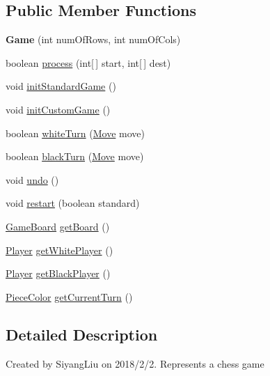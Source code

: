 \subsection*{Public Member Functions}
\begin{DoxyCompactItemize}
\item 
\mbox{\label{classgui_1_1_game_a254e8cb4da933dad9ae00a300f07a1a4}} 
{\bfseries Game} (int num\+Of\+Rows, int num\+Of\+Cols)
\item 
boolean \mbox{\hyperlink{classgui_1_1_game_a2ad737de5ea0e5ad722f8519ff771617}{process}} (int\mbox{[}$\,$\mbox{]} start, int\mbox{[}$\,$\mbox{]} dest)
\item 
void \mbox{\hyperlink{classgui_1_1_game_acde5ae47d364b6bddfc9be9fc535b8cc}{init\+Standard\+Game}} ()
\item 
void \mbox{\hyperlink{classgui_1_1_game_a74895d53bf09abcd355009defffb4303}{init\+Custom\+Game}} ()
\item 
boolean \mbox{\hyperlink{classgui_1_1_game_a451d11ef3789be8a74aae464c1fbfef3}{white\+Turn}} (\mbox{\hyperlink{classpieces_1_1_move}{Move}} move)
\item 
boolean \mbox{\hyperlink{classgui_1_1_game_a9f59968c4a6041a7e18a2898122a0f73}{black\+Turn}} (\mbox{\hyperlink{classpieces_1_1_move}{Move}} move)
\item 
void \mbox{\hyperlink{classgui_1_1_game_ae988eca0ead138d87285ea93d870385d}{undo}} ()
\item 
void \mbox{\hyperlink{classgui_1_1_game_a674b55155cbba7f976aa95caa017ee3b}{restart}} (boolean standard)
\item 
\mbox{\hyperlink{classgameboard_1_1_game_board}{Game\+Board}} \mbox{\hyperlink{classgui_1_1_game_afdc30ea2b00b6b06e255d3420d5c9e67}{get\+Board}} ()
\item 
\mbox{\hyperlink{classplayers_1_1_player}{Player}} \mbox{\hyperlink{classgui_1_1_game_a90a639909c028168666c3db0ac058610}{get\+White\+Player}} ()
\item 
\mbox{\hyperlink{classplayers_1_1_player}{Player}} \mbox{\hyperlink{classgui_1_1_game_a4fa4bff17684c1f215f0925e6266aeb0}{get\+Black\+Player}} ()
\item 
\mbox{\hyperlink{enumpieces_1_1_piece_1_1_piece_color}{Piece\+Color}} \mbox{\hyperlink{classgui_1_1_game_a7e5a9526328a3098b37bd3ea32f8359f}{get\+Current\+Turn}} ()
\end{DoxyCompactItemize}


\subsection{Detailed Description}
Created by Siyang\+Liu on 2018/2/2. Represents a chess game 


